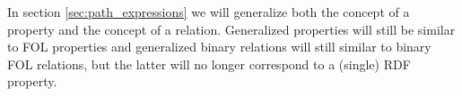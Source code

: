 In section \ref{sec:path_expressions} we will generalize
  both the concept of a property and the concept of a relation.
Generalized properties will still be similar to FOL properties
  and generalized binary relations will still similar to binary FOL relations,
  but the latter will no longer correspond to a (single) RDF property.

\begin{comment}
$\equivset{x}$ is the equivalence class for $x$
  under equivalence relation $\approx$.
\end{comment}

